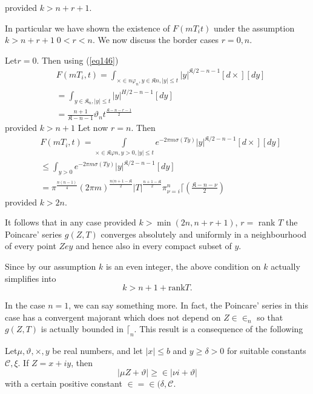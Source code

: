 provided $k>n+r	+1$.

In particular we have shown the existence of $F(m T_i t)$ under the
assumption $k> n + r+1 \; 0 <r <n$. We now discuss the border cases $r =
0, n$. 

Let\pageoriginale $r = 0$. Then using (\ref{eq146}) 
\begin{align*}
& F(m T_i, t) = \int  _{\times \in n \varphi_ n, y \in \mathfrak{K}n,
    |y| \leq t} |y|^{\mathfrak{K}/2-n-1} [d \times ][d y]\\ 
&= \int _{y \in \mathfrak{K}_n, |y| \leq t} |y|^{H/2 -n-1}[d y]\\ 
&= \frac{n+1}{\mathfrak{K}-n-1} \vartheta_n
  t^{\frac{\mathfrak{K}-n-r-1}{2}}  
\end{align*}
provided $k>n+1$ Let now $r=n$. Then  
\begin{align*}
& F(m T_i, t)= \int \limits _{\times \in  \mathfrak{K} \varphi n, y>0,
    |y| \leq t }e^{-2 \pi m \sigma (T y)}|y|^{\mathfrak{K}/2-n-1} [d
    \times ][d y]\\ 
&\leq \int _{y >0 } e^{-2 \pi m \sigma (T y)}|y|^{\mathfrak{K}/2-n-1}
  [d y]\\ 
&= \pi ^{\frac{n(n-1)} {4}}(2 \pi m) ^{\frac{n(n+1-
      \mathfrak{K}}{2}}|T| ^{\frac{n+1-\mathfrak{K}}{2}} \pi ^ n_{\nu
    =i} \lceil (\frac{\mathfrak{K}-n-\nu}{2}) 
\end{align*} 
provided $k > 2n$.

It follows  that in any case provided $k > \min (2n, n + r + 1)$, $r =$
rank $T$ the Poincare' series $g(Z, T)$ converges absolutely and
uniformly in a neighbourhood of every point $Z e y$ and
hence  also in every compact subset of $y$. 

Since by our assumption $k$ is an even integer, the above condition on
$k$ actually simplifies into  
$$
k>n + 1 + \text{rank} T.
$$ 

In the case $n= 1$, we can say something more. In fact, the Poincare'
series in this case has a convergent majorant which does not depend on
$Z \in \in _n$ so that $g(Z, T)$ is actually bounded in $\lceil
_n$. This result is a consequence of the following  

\setcounter{lem}{15}
\begin{lem}\label{chap9:lem16}%
 Let\pageoriginale $\mu, \vartheta, \times, y$ be real numbers, and let $|x|
   \leq b$ and $y \geq \delta >0$ for suitable constants $\mathscr{C},
   \xi$. If  $Z= x+ i y$, then  
 \begin{equation*}
|\mu Z + \vartheta| \geq \in |\nu i + \vartheta| \tag{168}\label{eq168}
\end{equation*}
with a certain positive constant $\in = \in (\delta , \mathscr{C}$.  
\end{lem}


